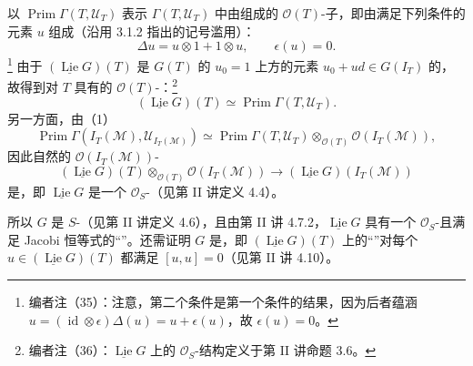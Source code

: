 以 $\operatorname{Prim}\Gamma(T,\mathcal U_T)$ 表示 $\Gamma(T,\mathcal U_T)$ 中由组成的 $\mathcal O(T)$-子，即由满足下列条件的元素 $u$ 组成（沿用 3.1.2 指出的记号滥用）：
\[
\Delta u=u\otimes1+1\otimes u,\qquad\epsilon(u)=0.
\]
\footnote{编者注（35）：注意，第二个条件是第一个条件的结果，因为后者蕴涵 $u=(\operatorname{id}\otimes\epsilon)\Delta(u)=u+\epsilon(u)$，故 $\epsilon(u)=0$。}
由于 $(\underline{\operatorname{Lie}}G)(T)$ 是 $G(T)$ 的 $u_0=1$ 上方的元素 $u_0+ud\in G(I_T)$ 的，故得到对 $T$ 具有的 $\mathcal O(T)$-：\footnote{编者注（36）：$\underline{\operatorname{Lie}}G$ 上的 $\mathcal O_S$-结构定义于第 II 讲命题 3.6。}
\[
(\underline{\operatorname{Lie}}G)(T)\simeq\operatorname{Prim}\Gamma(T,\mathcal U_T).
\]
另一方面，由（1）
\[
\operatorname{Prim}\Gamma(I_T(\mathcal M),\mathcal U_{I_T(\mathcal M)})\simeq\operatorname{Prim}\Gamma(T,\mathcal U_T)\otimes_{\mathcal O(T)}\mathcal O(I_T(\mathcal M)),
\]
因此自然的 $\mathcal O(I_T(\mathcal M))$-
\[
(\underline{\operatorname{Lie}}G)(T)\otimes_{\mathcal O(T)}\mathcal O(I_T(\mathcal M))\longrightarrow(\underline{\operatorname{Lie}}G)(I_T(\mathcal M))
\]
是，即 $\underline{\operatorname{Lie}}G$ 是一个 $\mathcal O_S$-（见第 II 讲定义 4.4）。

所以 $G$ 是 $S$-（见第 II 讲定义 4.6），且由第 II 讲 4.7.2，$\underline{\operatorname{Lie}}G$ 具有一个 $\mathcal O_S$-且满足 Jacobi 恒等式的“”。还需证明 $G$ 是，即 $(\underline{\operatorname{Lie}}G)(T)$ 上的“”对每个 $u\in(\underline{\operatorname{Lie}}G)(T)$ 都满足 $[u,u]=0$（见第 II 讲 4.10）。

